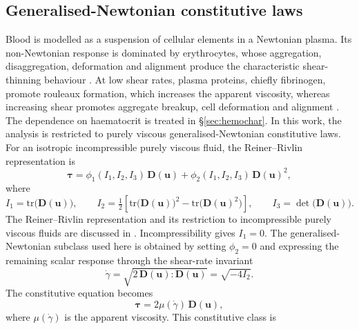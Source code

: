 \documentclass[lineno]{jfm}
\begin{document}
\subsection{Generalised-Newtonian constitutive laws}
Blood is modelled as a suspension of cellular elements in a Newtonian plasma.
Its non-Newtonian response is dominated by erythrocytes, whose aggregation,
disaggregation, deformation and alignment produce the characteristic
shear-thinning behaviour
\citep{haynes1959role,merrill1969rheology,chen2006non,ABUGATTAS2020529}.
At low shear rates, plasma proteins, chiefly fibrinogen, promote rouleaux
formation, which increases the apparent viscosity, whereas increasing shear
promotes aggregate breakup, cell deformation and alignment
\citep{FORMAGGIA-SPRINGER}. The dependence on haematocrit is treated
in \S\ref{sec:hemochar}.
In this work, the analysis is restricted to purely viscous
generalised-Newtonian constitutive laws. For an
isotropic incompressible purely viscous fluid, the Reiner--Rivlin
representation is
\begin{equation}
\boldsymbol{\tau}
=
\phi_1(I_1,I_2,I_3)\,\boldsymbol{D}(\boldsymbol{u})
+
\phi_2(I_1,I_2,I_3)\,\boldsymbol{D}(\boldsymbol{u})^2,
\label{eq:tau_general}
\end{equation}
where
\begin{equation}
I_1
=
\mathrm{tr}\bigl(\boldsymbol{D}(\boldsymbol{u})\bigr),
\qquad
I_2
=
\tfrac{1}{2}
\left[
\mathrm{tr}\bigl(\boldsymbol{D}(\boldsymbol{u})\bigr)^2
-
\mathrm{tr}\bigl(\boldsymbol{D}(\boldsymbol{u})^2\bigr)
\right],
\qquad
I_3
=
\det\bigl(\boldsymbol{D}(\boldsymbol{u})\bigr).
\label{eq:invariants}
\end{equation}
The Reiner--Rivlin representation and its restriction to incompressible
purely viscous fluids are discussed in
\citet{FORMAGGIA-SPRINGER,Sequeria2018}. Incompressibility gives $I_1=0$.
The generalised-Newtonian subclass used here is obtained by setting
$\phi_2=0$ and expressing the remaining scalar response through the
shear-rate invariant
\begin{equation}
\dot{\gamma}
=
\sqrt{
2\,\boldsymbol{D}(\boldsymbol{u})
:
\boldsymbol{D}(\boldsymbol{u})
}
=
\sqrt{-4I_2}.
\label{eq:shear-rate}
\end{equation}
The constitutive equation becomes
\begin{equation}
\boldsymbol{\tau}
=
2\mu(\dot{\gamma})\,\boldsymbol{D}(\boldsymbol{u}),
\label{eq:gnf}
\end{equation}
where $\mu(\dot\gamma)$ is the apparent viscosity. This constitutive class is
\end{document}
